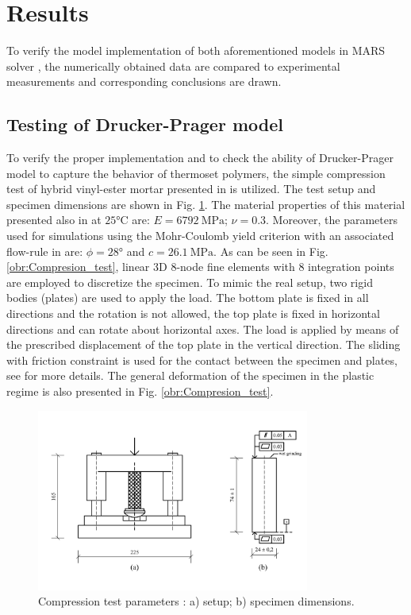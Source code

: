\thispagestyle{plain}
\section{Results}
\indent

To verify the model implementation of both aforementioned models in MARS solver \cite{mars}, the numerically obtained data are compared to experimental measurements \cite{heinrich2012generation,Deuch_phd_thesis} and corresponding conclusions are drawn.


\subsection{Testing of Drucker-Prager model}
\indent
 
To verify the proper implementation and to check the ability of Drucker-Prager model to capture the behavior of thermoset polymers, the simple compression test of hybrid vinyl-ester mortar presented in \cite{Deuch_phd_thesis} is utilized. The test setup and specimen dimensions are shown in Fig. \ref{obr:test_param}. The material properties of this material presented also in \cite{Deuch_phd_thesis} at $\ang{25}\mathrm{C} $ are: $E = 6792~\mathrm{MPa}$; $\nu = 0.3$. Moreover, the parameters used for simulations using the Mohr-Coulomb yield criterion with an associated flow-rule in \cite{Deuch_phd_thesis} are: $\phi = \ang{28}$ and $c = 26.1~\mathrm{MPa}$. As can be seen in Fig. \ref{obr:Compresion_test}, linear 3D 8-node fine elements with 8 integration points are employed to discretize the specimen. To mimic the real setup, two rigid bodies (plates) are used to apply the load. The bottom plate is fixed in all directions and the rotation is not allowed, the top plate is fixed in horizontal directions and can rotate about horizontal axes. The load is applied by means of the prescribed displacement of the top plate in the vertical direction. The sliding with friction constraint is used for the contact between the specimen and plates, see \cite{mars} for more details. The general deformation of the specimen in the plastic regime is also presented in Fig. \ref{obr:Compresion_test}. 

\begin{figure}[h!]
	\centering
	\includegraphics[width=0.8\textwidth]{obrazky/test_parameters.png}
	\caption[Compression test parameters]{Compression test parameters \cite{Deuch_phd_thesis}: a) setup; b) specimen dimensions.}\label{obr:test_param}
\end{figure}

